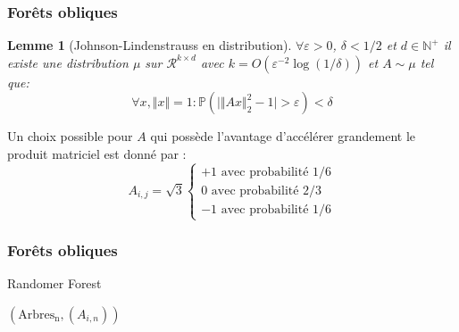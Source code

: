 \documentclass[dvipsnames,10pt]{beamer}
\theoremstyle{plain}
\newtheorem{lemme}{Lemme}
\theoremstyle{definition}
\begin{document}
\begin{frame}
\frametitle{Forêts obliques}
\begin{lemme}[Johnson-Lindenstrauss en distribution]
    $\forall \varepsilon > 0$, $\delta < 1/2$ et $d \in \mathbb{N}^+$ il existe une distribution $\mu$ sur $\mathcal{R}^{k \times d}$ avec $k = O( \varepsilon^{-2} \log ( 1 / \delta) )$ et $A \sim \mu$ tel que:
    \begin{equation*}
        \forall x , \Vert x \Vert = 1 : \mathbb{P} \left( \vert \Vert A x \Vert^2_2 - 1 \vert > \varepsilon \right) < \delta
    \end{equation*}
\end{lemme}
Un choix possible pour $A$ qui possède l'avantage d'accélérer grandement le produit matriciel est donné par \citet{Achlioptas2003}:
\begin{equation*}
    A_{i,j} = \sqrt{3} \begin{cases}
        +1 \text{ avec probabilité } 1/6 \\
        0 \text{ avec probabilité } 2/3 \\
        -1 \text{ avec probabilité } 1/6
    \end{cases}
\end{equation*}
\end{frame}

\begin{frame}[fragile]
\frametitle{Forêts obliques}
\begin{algorithm}[H]
\caption{Randomer Forest} \label{randomer.forest.alg}
\begin{algorithmic}
        \EndFor
    \EndFor
    \State \Return $\left(\mathrm{Arbres_n},\left( A_{i,n} \right) \right)$
    \EndProcedure
\end{algorithmic}    
\end{algorithm}
\end{frame}
\end{document}

